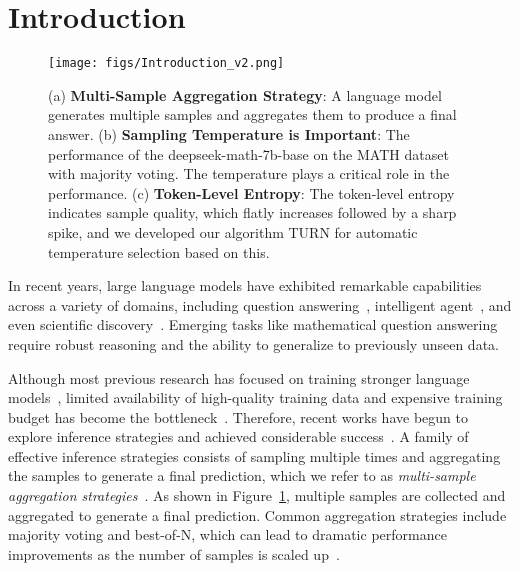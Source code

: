 \section{Introduction}
\begin{figure}[ht]
    \centering
    \texttt{[image: figs/Introduction\_v2.png]}
    \caption{(a) \textbf{Multi-Sample Aggregation Strategy}: A language model generates multiple samples and aggregates them to produce a final answer. (b) \textbf{Sampling Temperature is Important}: The performance of the deepseek-math-7b-base on the MATH dataset with majority voting. The temperature plays a critical role in the performance. (c) \textbf{Token-Level Entropy}: The token-level entropy indicates sample quality, which flatly increases followed by a sharp spike, and we developed our algorithm \textsc{TURN} for automatic temperature selection based on this.}
    \label{fig: temp_in_intro}
\end{figure}
In recent years, large language models have exhibited remarkable capabilities across a variety of domains, including question answering~\cite{kamalloo2023evaluating}, intelligent agent~\cite{wang2024survey, zhang2023building}, and even scientific discovery~\cite{ma2024llm, romera2024mathematical}. 
Emerging tasks like mathematical question answering require robust reasoning and the ability to generalize to previously unseen data. %

Although most previous research has focused on training stronger language models~\cite{zhou2024comprehensive, zhang2023instruction, fernandes2023bridging}, limited availability of high-quality training data and expensive training budget has become the bottleneck~\cite{jones2024ai}. Therefore, recent works have begun to explore inference strategies and achieved considerable success~\cite{wei2022chain, yao2024tree, madaan2024self}. A family of effective inference strategies consists of sampling multiple times and aggregating the samples to generate a final prediction, which we refer to as \emph{multi-sample aggregation strategies}~\cite{welleck2024decoding, wang2022self}. As shown in Figure~\ref{fig: temp_in_intro}, multiple samples are collected and aggregated to generate a final prediction. Common aggregation strategies include majority voting and best-of-N, which can lead to dramatic performance improvements as the number of samples is scaled up~\cite{wang2022self, wang2024planning}.

